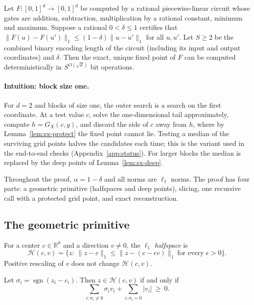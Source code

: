 \begin{theorem}\label{thm:sx-pl}
\statusrefereed
Let $F:[0,1]^d\to[0,1]^d$ be computed by a rational piecewise-linear circuit whose gates are addition,
subtraction, multiplication by a rational constant, minimum and maximum. Suppose a rational
$0<\delta\le1$ certifies that $\|F(u)-F(u')\|_1\le(1-\delta)\|u-u'\|_1$ for all $u,u'$. Let $S\ge2$ be the
combined binary encoding length of the circuit (including its input and output coordinates) and
$\delta$. Then the exact, unique fixed point of $F$ can be computed deterministically in $S^{O(\sqrt d)}$
bit operations.
\end{theorem}

\paragraph{Intuition: block size one.} For $d=2$ and blocks of size one, the outer search is a search on
the first coordinate. At a test value $c$, solve the one-dimensional tail approximately, compute
$h=G_X(c,y)$, and discard the side of $c$ away from $h$, where by Lemma~\ref{lem:sx-protect} the fixed
point cannot lie. Testing a median of the surviving grid points halves the candidates each time; this is
the variant used in the end-to-end checks (Appendix~\ref{app:status}). For larger blocks the median is
replaced by the deep points of Lemma~\ref{lem:sx-deep}.

Throughout the proof, $\alpha=1-\delta$ and all norms are $\ell_1$ norms. The proof has four parts: a
geometric primitive (halfspaces and deep points), slicing, one recursive call with a protected grid
point, and exact reconstruction.

\subsection{The geometric primitive}

For a center $c\in\mathbb R^k$ and a direction $v\ne0$, the \emph{$\ell_1$ halfspace} is
\[
  \mathcal H(c,v)=\{z:\ \|z-c\|_1\le\|z-(c-\epsilon v)\|_1\ \text{for every }\epsilon>0\}.
\]
Positive rescaling of $v$ does not change $\mathcal H(c,v)$.

\begin{lemma}\label{lem:sx-sign}
Let $\sigma_i=\operatorname{sgn}(z_i-c_i)$. Then $z\in\mathcal H(c,v)$ if and only if
\[
  \sum_{i:\sigma_i\ne0}\sigma_iv_i+\sum_{i:\sigma_i=0}|v_i|\ \ge\ 0 .
\]
\end{lemma}

